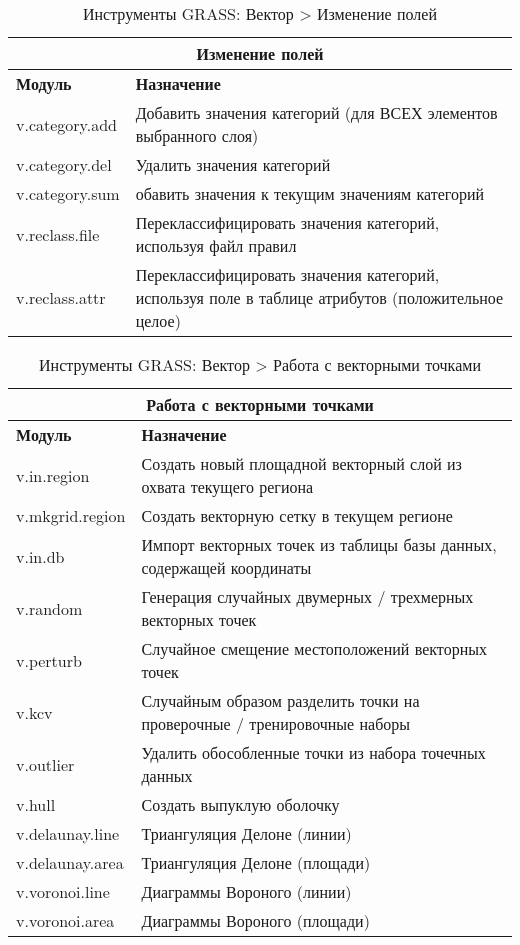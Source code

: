 {\renewcommand{\arraystretch}{0.7}
\begin{table}[H]
\centering
 \begin{tabular}{|p{4cm}|p{10cm}|}
  \hline \multicolumn{2}{|c|}{\textbf{Изменение полей}} \\
  \hline \textbf{Модуль} & \textbf{Назначение} \\
  \hline v.category.add & Добавить значения категорий (для ВСЕХ элементов
  выбранного слоя)\\
  \hline v.category.del & Удалить значения категорий \\
  \hline v.category.sum & обавить значения к текущим значениям категорий \\
  \hline v.reclass.file & Переклассифицировать значения категорий,
  используя файл правил \\
  \hline v.reclass.attr & Переклассифицировать значения категорий,
  используя поле в таблице атрибутов (положительное целое) \\
\hline
\end{tabular}
\caption{Инструменты GRASS: Вектор > Изменение полей}
\end{table}}

{\renewcommand{\arraystretch}{0.7}
\begin{table}[H]
\centering
 \begin{tabular}{|p{4cm}|p{10cm}|}
  \hline \multicolumn{2}{|c|}{\textbf{Работа с векторными точками}} \\
  \hline \textbf{Модуль} & \textbf{Назначение} \\
  \hline v.in.region & Создать новый площадной векторный слой из охвата
  текущего региона \\
  \hline v.mkgrid.region & Создать векторную сетку в текущем регионе \\
  \hline v.in.db & Импорт векторных точек из таблицы базы данных, содержащей
  координаты \\
  \hline v.random & Генерация случайных двумерных / трехмерных векторных
  точек \\
  \hline v.perturb & Случайное смещение местоположений векторных точек \\
  \hline v.kcv & Случайным образом разделить точки на проверочные / тренировочные
  наборы \\
  \hline v.outlier & Удалить обособленные точки из набора точечных данных \\
  \hline v.hull & Создать выпуклую оболочку \\
  \hline v.delaunay.line & Триангуляция Делоне (линии) \\
  \hline v.delaunay.area & Триангуляция Делоне (площади) \\
  \hline v.voronoi.line & Диаграммы Вороного (линии) \\
  \hline v.voronoi.area & Диаграммы Вороного (площади) \\
\hline
\end{tabular}
\caption{Инструменты GRASS: Вектор > Работа с векторными точками}
\end{table}}

